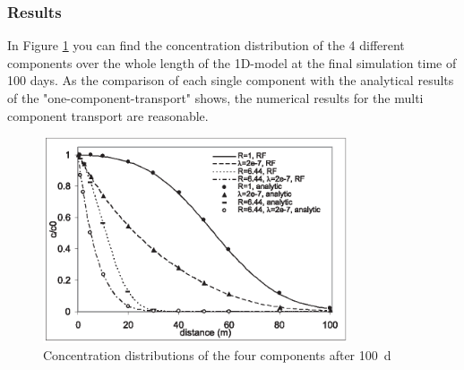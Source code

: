 \subsubsection{Results}

In Figure \ref{fig59} you can find the concentration distribution of the 4 different components over the whole length of the 1D-model at the final simulation time of 100 days. As the comparison of each single component with the analytical results of the "one-component-transport" shows, the numerical results for the multi component transport are reasonable.

\begin{figure}[htbp]
\centering
\includegraphics[width=0.8\textwidth]{PART_II/C/fig59.eps}
\caption{Concentration distributions of the four components after 100~d}
\label{fig59}
\end{figure}
